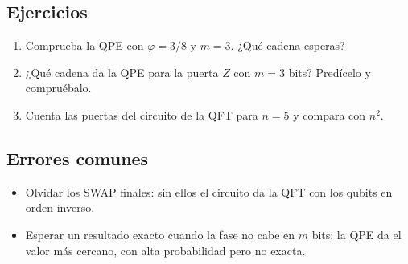 \subsection{Ejercicios}
\begin{enumerate}
  \item Comprueba la QPE con $\varphi=3/8$ y $m=3$. ¿Qué cadena esperas?
  \item ¿Qué cadena da la QPE para la puerta $Z$ con $m=3$ bits? Predícelo
    y compruébalo.
  \item Cuenta las puertas del circuito de la QFT para $n=5$ y compara con
    $n^2$.
\end{enumerate}

\subsection{Errores comunes}
\begin{itemize}
  \item Olvidar los SWAP finales: sin ellos el circuito da la QFT con los
    qubits en orden inverso.
  \item Esperar un resultado exacto cuando la fase no cabe en $m$ bits:
    la QPE da el valor más cercano, con alta probabilidad pero no exacta.
\end{itemize}


